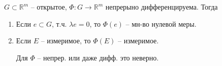 \begin{theorem}
    $G \subset \mathbb{R}^m$ -- открытое, $\Phi: G \rightarrow \mathbb{R}^m$ непрерыно дифференцируема. Тогда

    \begin{enumerate}
        \item {
            Если $e \subset G$, т.ч. $\lambda e = 0$, то $\Phi(e)$ -- мн-во нулевой меры.
        }
        \item {
            Если  $E$ -- измеримое, то $\Phi(E)$ -- измеримое.

            \begin{remark}
                Для $\Phi$ -- непрер. или даже дифф. это неверно.
            \end{remark}
        }
    \end{enumerate}
\end{theorem}
